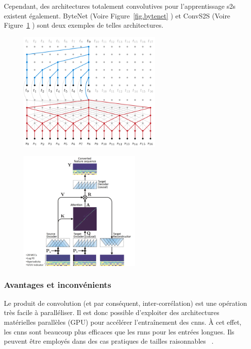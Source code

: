 Cependant, des architectures totalement convolutives pour l'apprentissage \gls{s2s} existent également.
ByteNet (Voire Figure~\ref{fig.bytenet}
)
et ConvS2S (Voire Figure~\ref{fig.convs2s}
)
sont deux exemples de telles architectures.

\begin{figure}
    \centering
    \begin{minipage}{.5\linewidth}
        \centering
        \includegraphics[height=6cm]{assets/images/bytenet.png}
        \label{fig.bytenet}
    \end{minipage}%
    \begin{minipage}{.5\linewidth}
        \centering
        \includegraphics[height=6cm]{assets/images/convs2s.png}
        \label{fig.convs2s}
    \end{minipage}
\end{figure}


\subsubsection{Avantages et inconvénients}

Le produit de convolution (et par conséquent, inter-corrélation) 
est une opération très facile à paralléliser.
Il est donc possible d'exploiter des architectures matérielles parallèles (GPU) 
pour accélérer l'entraînement des \glspl{cnn}.
À cet effet, les \glspl{cnn} sont beaucoup plus efficaces que les \glspl{rnn} pour les entrées longues. 
Ils peuvent être employés dans des cas pratiques de tailles raisonnables%
~\cite{Li_Zhang_Huang_Wang_Zheng_2016}.

